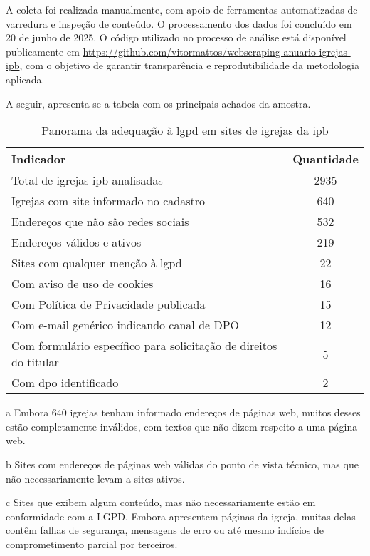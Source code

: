 A coleta foi realizada manualmente, com apoio de ferramentas automatizadas de varredura e inspeção de conteúdo. O processamento dos dados foi concluído em 20 de junho de 2025. O código utilizado no processo de análise está disponível publicamente em \url{https://github.com/vitormattos/webscraping-anuario-igrejas-ipb}, com o objetivo de garantir transparência e reprodutibilidade da metodologia aplicada.

A seguir, apresenta-se a tabela com os principais achados da amostra.

\begin{table}[H]
\centering
\begin{threeparttable}
\caption{Panorama da adequação à \gls{lgpd} em sites de igrejas da \gls{ipb}}
\begin{tabularx}{\textwidth}{>{\raggedright\arraybackslash}X c}
\toprule
\textbf{Indicador} & \textbf{Quantidade} \\
\midrule
Total de igrejas \gls{ipb} analisadas & 2935 \\
Igrejas com site informado no cadastro\tnote{a} & 640 \\
Endereços que não são redes sociais\tnote{b} & 532 \\
Endereços válidos e ativos\tnote{c} & 219 \\
Sites com qualquer menção à \gls{lgpd} & 22 \\
Com aviso de uso de cookies & 16 \\
Com Política de Privacidade publicada & 15 \\
Com e-mail genérico indicando canal de DPO\tnote{d} & 12 \\
Com formulário específico para solicitação de direitos do titular\tnote{e} & 5 \\
Com \gls{dpo} identificado\tnote{f} & 2 \\
\bottomrule
\end{tabularx}
\begin{tablenotes}
\footnotesize
\item[a] Embora 640 igrejas tenham informado endereços de páginas web, muitos desses estão completamente inválidos, com textos que não dizem respeito a uma página web.
\item[b] Sites com endereços de páginas web válidas do ponto de vista técnico, mas que não necessariamente levam a sites ativos.
\item[c] Sites que exibem algum conteúdo, mas não necessariamente estão em conformidade com a LGPD. Embora apresentem páginas da igreja, muitas delas contêm falhas de segurança, mensagens de erro ou até mesmo indícios de comprometimento parcial por terceiros.

\end{tablenotes}
\end{threeparttable}
\end{table}
